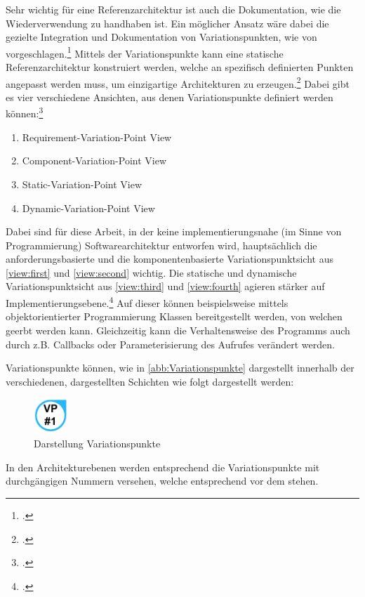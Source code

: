Sehr wichtig für eine Referenzarchitektur ist auch die Dokumentation, wie die Wiederverwendung zu handhaben ist. Ein möglicher Ansatz wäre dabei die gezielte Integration und Dokumentation von Variationspunkten, wie von \citeauthor{Webber.2001} vorgeschlagen.\footcite[Vgl.][24\psqq]{Webber.2001} Mittels der Variationspunkte kann eine statische Referenzarchitektur konstruiert werden, welche an spezifisch definierten Punkten angepasst werden muss, um einzigartige Architekturen zu erzeugen.\footcite[Vgl.][24]{Webber.2001} Dabei gibt es vier verschiedene Ansichten, aus denen Variationspunkte definiert werden können:\footcite[Vgl.][25\psq]{Webber.2001}
\begin{enumerate}
\item \label{view:first} Requirement-Variation-Point View
\item \label{view:second} Component-Variation-Point View
\item \label{view:third} Static-Variation-Point View
\item \label{view:fourth} Dynamic-Variation-Point View
\end{enumerate}
Dabei sind für diese Arbeit, in der keine implementierungsnahe (im Sinne von Programmierung) Softwarearchitektur entworfen wird, hauptsächlich die anforderungsbasierte und die komponentenbasierte Variationspunktsicht aus \autoref{view:first} und \autoref{view:second} wichtig. Die statische und dynamische Variationspunktsicht aus \autoref{view:third} und \autoref{view:fourth} agieren stärker auf Implementierungsebene.\footcite[Vgl. auch im Folgenden][25\psq]{Webber.2001} Auf dieser können beispielsweise mittels objektorientierter Programmierung Klassen bereitgestellt werden, von welchen geerbt werden kann. Gleichzeitig kann die Verhaltensweise des Programms auch durch z.B. Callbacks oder Parameterisierung des Aufrufes verändert werden.

\renewcommand\#{\protect\scalebox{0.8}{\protect\raisebox{0.4ex}{\char"0023}}}

Variationspunkte können, wie in \autoref{abb:Variationspunkte} dargestellt innerhalb der verschiedenen, dargestellten Schichten wie folgt dargestellt werden:
\begin{figure}[H]
\centering
\includegraphics[height=1.33cm]{graphics/Variationpoints.pdf}
\caption{Darstellung Variationspunkte}
\label{abb:Variationspunkte}
\end{figure}
In den Architekturebenen werden entsprechend die Variationspunkte mit durchgängigen Nummern versehen, welche entsprechend vor dem \# stehen.






